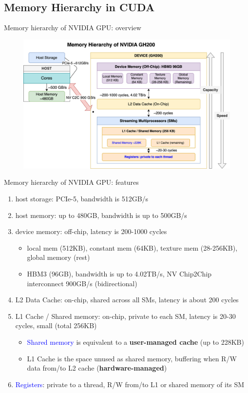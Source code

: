 \documentclass[dvipdfmx, 11pt, aspectratio=169]{beamer}   %
\begin{document}
\subsection{Memory Hierarchy in CUDA}
\begin{frame}{Memory hierarchy of NVIDIA GPU: overview}
  \begin{figure}
    \includegraphics[scale=0.105]{img/memHierarchy.png}
  \end{figure}
\end{frame}
\begin{frame}{Memory hierarchy of NVIDIA GPU: features}
  \begin{enumerate}
    \item host storage: PCIe-5, bandwidth is 512GB/s
    \item host memory: up to 480GB, bandwidth is up to 500GB/s
    \item device memory: off-chip, latency is 200-1000 cycles
    \begin{itemize}
      \item local mem (512KB), constant mem (64KB), texture mem (28-256KB), global memory (rest)
      \item HBM3 (96GB), bandwidth is  up to 4.02TB/s, NV Chip2Chip interconnect 900GB/s (bidirectional)
    \end{itemize}
    \item L2 Data Cache: on-chip, shared across all SMs, latency is about 200 cycles
    \item L1 Cache / Shared memory: on-chip, private to each SM, latency is 20-30 cycles, small (total 256KB)
    \begin{itemize}
      \item \textcolor{blue}{Shared memory} is equivalent to a \textbf{user-managed cache} (up to 228KB)
      \item L1 Cache is the space unused as shared memory, buffering when R/W data from/to L2 cache (\textbf{hardware-managed})
    \end{itemize}
    \item \textcolor{blue}{Registers}: private to a thread, R/W from/to L1 or shared memory of its SM
  \end{enumerate}
\end{frame}
\end{document}
